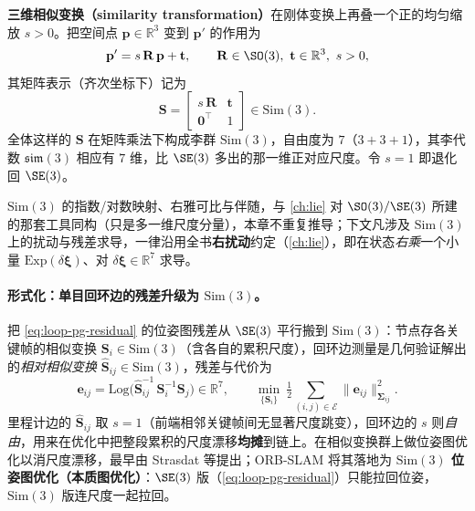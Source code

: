 \begin{definition}\label{def:loop-sim3}
\textbf{三维相似变换（similarity transformation）}在刚体变换上再叠一个正的均匀缩放 $s>0$。把空间点 $\mathbf p\in\mathbb R^3$ 变到 $\mathbf p'$ 的作用为
\begin{equation}
  \mathbf p' = s\,\mathbf R\,\mathbf p + \mathbf t,\qquad \mathbf R\in\SO(3),\ \mathbf t\in\mathbb R^3,\ s>0,
  \label{eq:loop-sim3-action}
\end{equation}
其矩阵表示（齐次坐标下）记为
\begin{equation}
  \mathbf S=\begin{bmatrix} s\,\mathbf R & \mathbf t\\ \mathbf 0^\top & 1\end{bmatrix}\in\mathrm{Sim}(3).
  \label{eq:loop-sim3-mat}
\end{equation}
全体这样的 $\mathbf S$ 在矩阵乘法下构成李群 $\mathrm{Sim}(3)$，自由度为 $7$（$3+3+1$），其李代数 $\mathfrak{sim}(3)$ 相应有 $7$ 维，比 $\SE(3)$ 多出的那一维正对应尺度。令 $s=1$ 即退化回 $\SE(3)$。
\end{definition}

\noindent$\mathrm{Sim}(3)$ 的指数/对数映射、右雅可比与伴随，与 \cref{ch:lie} 对 $\SO(3)/\SE(3)$ 所建的那套工具同构（只是多一维尺度分量），本章不重复推导；下文凡涉及 $\mathrm{Sim}(3)$ 上的扰动与残差求导，一律沿用全书\textbf{右扰动}约定（\cref{ch:lie}），即在状态\emph{右乘}一个小量 $\mathrm{Exp}(\delta\boldsymbol\xi)$、对 $\delta\boldsymbol\xi\in\mathbb R^7$ 求导。

\paragraph{形式化：单目回环边的残差升级为 \texorpdfstring{$\mathrm{Sim}(3)$}{Sim(3)}。}
把 \cref{eq:loop-pg-residual} 的位姿图残差从 $\SE(3)$ 平行搬到 $\mathrm{Sim}(3)$：节点存各关键帧的相似变换 $\mathbf S_i\in\mathrm{Sim}(3)$（含各自的累积尺度），回环边测量是几何验证解出的\emph{相对相似变换} $\hat{\mathbf S}_{ij}\in\mathrm{Sim}(3)$，残差与代价为
\begin{equation}
  \mathbf e_{ij}=\mathrm{Log}\!\big(\hat{\mathbf S}_{ij}^{-1}\,\mathbf S_i^{-1}\mathbf S_j\big)\in\mathbb R^{7},\qquad
  \min_{\{\mathbf S_i\}}\ \tfrac12\!\!\sum_{(i,j)\in\mathcal E}\!\!\lVert\mathbf e_{ij}\rVert_{\boldsymbol\Sigma_{ij}}^2 .
  \label{eq:loop-sim3-residual}
\end{equation}
里程计边的 $\hat{\mathbf S}_{ij}$ 取 $s=1$（前端相邻关键帧间无显著尺度跳变），回环边的 $s$ 则\emph{自由}，用来在优化中把整段累积的尺度漂移\textbf{均摊}到链上。在相似变换群上做位姿图优化以消尺度漂移，最早由 Strasdat 等提出\cite{strasdat2012thesis}；ORB-SLAM 将其落地为 \textbf{$\mathrm{Sim}(3)$ 位姿图优化（本质图优化）}\cite{murartal2015orbslam}：$\SE(3)$ 版（\cref{eq:loop-pg-residual}）只能拉回位姿，$\mathrm{Sim}(3)$ 版连尺度一起拉回。

